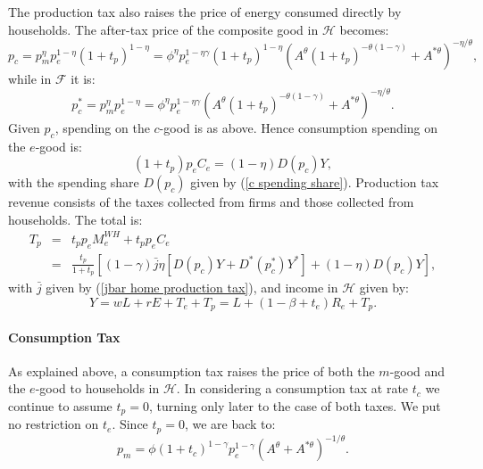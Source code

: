 \documentclass[notitlepage,12pt]{article}
\begin{document}
The production tax also raises the price of energy consumed directly by
households. The after-tax price of the composite good in $\mathcal{H}$
becomes:%
\begin{equation}
p_{c}=p_{m}^{\eta }p_{e}^{1-\eta }(1+t_{p})^{1-\eta }=\phi ^{\eta
}p_{e}^{1-\eta \gamma }(1+t_{p})^{1-\eta }\left( A^{\theta }\left(
1+t_{p}\right) ^{-\theta \left( 1-\gamma \right) }+A^{\ast \theta }\right)
^{-\eta /\theta },  \label{p_c home production tax}
\end{equation}%
while in $\mathcal{F}$ it is:%
\begin{equation}
p_{c}^{\ast }=p_{m}^{\eta }p_{e}^{1-\eta }=\phi ^{\eta }p_{e}^{1-\eta \gamma
}\left( A^{\theta }\left( 1+t_{p}\right) ^{-\theta \left( 1-\gamma \right)
}+A^{\ast \theta }\right) ^{-\eta /\theta }.
\label{p_c star home production tax}
\end{equation}%
Given $p_{c}$, spending on the $c$-good is as above. Hence consumption
spending on the $e$-good is:%
\begin{equation*}
(1+t_{p})p_{e}C_{e}=\left( 1-\eta \right) D(p_{c})Y,
\end{equation*}%
with the spending share $D(p_{c})$ given by (\ref{c spending share}).
Production tax revenue consists of the taxes collected from firms and those
collected from households. The total is:%
\begin{eqnarray*}
T_{p} &=&t_{p}p_{e}M_{e}^{WH}+t_{p}p_{e}C_{e} \\
&=&\frac{t_{p}}{1+t_{p}}\left[ \left( 1-\gamma \right) \bar{j}\eta \left[
D(p_{c})Y+D^{\ast }(p_{c}^{\ast })Y^{\ast }\right] +\left( 1-\eta \right)
D(p_{c})Y\right] ,
\end{eqnarray*}%
with $\bar{j}$ given by (\ref{jbar home production tax}), and income in $%
\mathcal{H}$ given by:%
\begin{equation}
Y=wL+rE+T_{e}+T_{p}=L+\left( 1-\beta +t_{e}\right) R_{e}+T_{p}.
\label{Y home production tax}
\end{equation}

\paragraph{Consumption Tax}

As explained above, a consumption tax raises the price of both the $m$-good
and the $e$-good to households in $\mathcal{H}$. In considering a
consumption tax at rate $t_{c}$ we continue to assume $t_{p}=0$, turning
only later to the case of both taxes. We put no restriction on $t_{e}$.
Since $t_{p}=0$, we are back to:%
\begin{equation*}
p_{m}=\phi (1+t_{c})^{1-\gamma }p_{e}^{1-\gamma }\left( A^{\theta }+A^{\ast
\theta }\right) ^{-1/\theta }.
\end{equation*}
\end{document}
